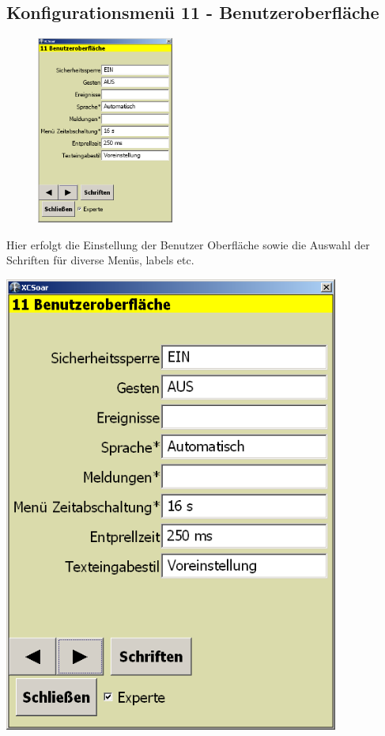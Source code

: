 \subsection{Konfigurationsmenü 11 - Benutzeroberfläche}\label{Konfig11}
\begin{figure}
\includegraphics[width=4.5cm]{Bilder/Konfig11BenutzerOF.png}
\end{figure}
Hier erfolgt die Einstellung der Benutzer Oberfläche sowie die Auswahl der Schriften für diverse Menüs, labels etc.\
\begin{center}
\includegraphics[width=11cm]{Bilder/Konfig11BenutzerOF.png}
\end{center}
